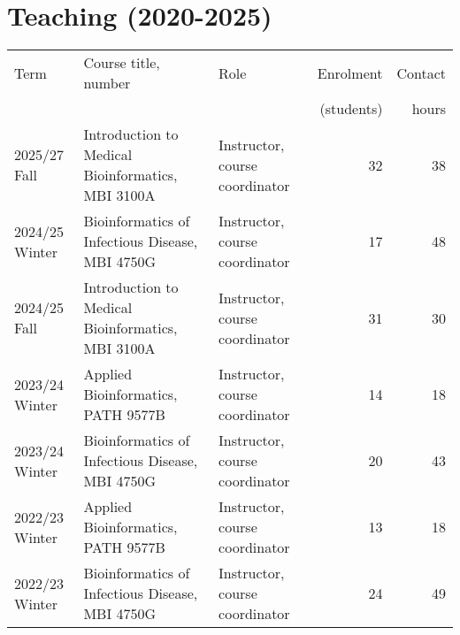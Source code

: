 
\clearpage
\section{Teaching (2020-2025)}



\bgroup
\setlength{\tabcolsep}{6pt}
\def\arraystretch{1.3}%
\begin{tabular}{lp{2.35in}p{1.2in}rr}
Term & Course title, number & Role & Enrolment & Contact\\[-3pt]
  &  &  &  (students) & hours \\
\hline

2025/27 Fall & Introduction to Medical Bioinformatics, MBI 3100A & Instructor, course coordinator & 32 & 38\\

2024/25 Winter & Bioinformatics of Infectious Disease, MBI 4750G & Instructor, course coordinator & 17 & 48\\

2024/25 Fall & Introduction to Medical Bioinformatics, MBI 3100A & Instructor, course coordinator & 31 & 30\\

2023/24 Winter & Applied Bioinformatics, PATH 9577B & Instructor, course coordinator & 14 & 18\\
2023/24 Winter & Bioinformatics of Infectious Disease, MBI 4750G & Instructor, course coordinator & 20 & 43\\ 

2022/23 Winter & Applied Bioinformatics, PATH 9577B & Instructor, course coordinator & 13 & 18\\
2022/23 Winter & Bioinformatics of Infectious Disease, MBI 4750G & Instructor, course coordinator & 24 & 49\\


\end{tabular}

